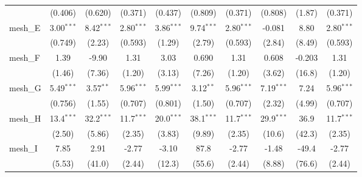 \begin{tabular}{lccccccccc}
                                                               & (0.406)       & (0.620)       & (0.371)       & (0.437)       & (0.809)        & (0.371)       & (0.808)       & (1.87)         & (0.371)\\   
   mesh\_E                                                     & 3.00$^{***}$  & 8.42$^{***}$  & 2.80$^{***}$  & 3.86$^{***}$  & 9.74$^{***}$   & 2.80$^{***}$  & -0.081        & 8.80           & 2.80$^{***}$\\   
                                                               & (0.749)       & (2.23)        & (0.593)       & (1.29)        & (2.79)         & (0.593)       & (2.84)        & (8.49)         & (0.593)\\   
   mesh\_F                                                     & 1.39          & -9.90         & 1.31          & 3.03          & 0.690          & 1.31          & 0.608         & -0.203         & 1.31\\   
                                                               & (1.46)        & (7.36)        & (1.20)        & (3.13)        & (7.26)         & (1.20)        & (3.62)        & (16.8)         & (1.20)\\   
   mesh\_G                                                     & 5.49$^{***}$  & 3.57$^{**}$   & 5.96$^{***}$  & 5.99$^{***}$  & 3.12$^{**}$    & 5.96$^{***}$  & 7.19$^{***}$  & 7.24           & 5.96$^{***}$\\   
                                                               & (0.756)       & (1.55)        & (0.707)       & (0.801)       & (1.50)         & (0.707)       & (2.32)        & (4.99)         & (0.707)\\   
   mesh\_H                                                     & 13.4$^{***}$  & 32.2$^{***}$  & 11.7$^{***}$  & 20.0$^{***}$  & 38.1$^{***}$   & 11.7$^{***}$  & 29.9$^{***}$  & 36.9           & 11.7$^{***}$\\   
                                                               & (2.50)        & (5.86)        & (2.35)        & (3.83)        & (9.89)         & (2.35)        & (10.6)        & (42.3)         & (2.35)\\   
   mesh\_I                                                     & 7.85          & 2.91          & -2.77         & -3.10         & 87.8           & -2.77         & -1.48         & -49.4          & -2.77\\   
                                                               & (5.53)        & (41.0)        & (2.44)        & (12.3)        & (55.6)         & (2.44)        & (8.88)        & (76.6)         & (2.44)\\   

\end{tabular}

